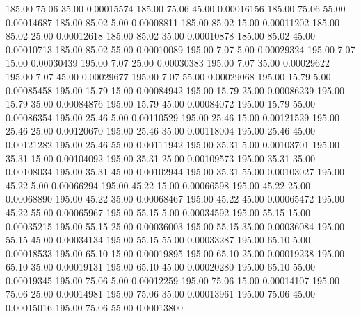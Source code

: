     185.00     75.06     35.00     0.00015574
    185.00     75.06     45.00     0.00016156
    185.00     75.06     55.00     0.00014687
    185.00     85.02      5.00     0.00008811
    185.00     85.02     15.00     0.00011202
    185.00     85.02     25.00     0.00012618
    185.00     85.02     35.00     0.00010878
    185.00     85.02     45.00     0.00010713
    185.00     85.02     55.00     0.00010089
    195.00      7.07      5.00     0.00029324
    195.00      7.07     15.00     0.00030439
    195.00      7.07     25.00     0.00030383
    195.00      7.07     35.00     0.00029622
    195.00      7.07     45.00     0.00029677
    195.00      7.07     55.00     0.00029068
    195.00     15.79      5.00     0.00085458
    195.00     15.79     15.00     0.00084942
    195.00     15.79     25.00     0.00086239
    195.00     15.79     35.00     0.00084876
    195.00     15.79     45.00     0.00084072
    195.00     15.79     55.00     0.00086354
    195.00     25.46      5.00     0.00110529
    195.00     25.46     15.00     0.00121529
    195.00     25.46     25.00     0.00120670
    195.00     25.46     35.00     0.00118004
    195.00     25.46     45.00     0.00121282
    195.00     25.46     55.00     0.00111942
    195.00     35.31      5.00     0.00103701
    195.00     35.31     15.00     0.00104092
    195.00     35.31     25.00     0.00109573
    195.00     35.31     35.00     0.00108034
    195.00     35.31     45.00     0.00102944
    195.00     35.31     55.00     0.00103027
    195.00     45.22      5.00     0.00066294
    195.00     45.22     15.00     0.00066598
    195.00     45.22     25.00     0.00068890
    195.00     45.22     35.00     0.00068467
    195.00     45.22     45.00     0.00065472
    195.00     45.22     55.00     0.00065967
    195.00     55.15      5.00     0.00034592
    195.00     55.15     15.00     0.00035215
    195.00     55.15     25.00     0.00036003
    195.00     55.15     35.00     0.00036084
    195.00     55.15     45.00     0.00034134
    195.00     55.15     55.00     0.00033287
    195.00     65.10      5.00     0.00018533
    195.00     65.10     15.00     0.00019895
    195.00     65.10     25.00     0.00019238
    195.00     65.10     35.00     0.00019131
    195.00     65.10     45.00     0.00020280
    195.00     65.10     55.00     0.00019345
    195.00     75.06      5.00     0.00012259
    195.00     75.06     15.00     0.00014107
    195.00     75.06     25.00     0.00014981
    195.00     75.06     35.00     0.00013961
    195.00     75.06     45.00     0.00015016
    195.00     75.06     55.00     0.00013800
